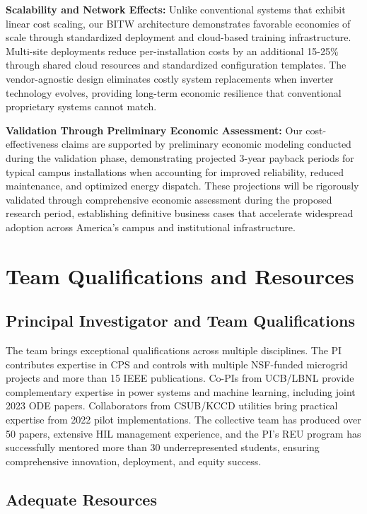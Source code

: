 \documentclass[12pt]{article}
\begin{document}
\textbf{Scalability and Network Effects:} Unlike conventional systems that exhibit linear cost scaling, our BITW architecture demonstrates favorable economies of scale through standardized deployment and cloud-based training infrastructure. Multi-site deployments reduce per-installation costs by an additional 15-25\% through shared cloud resources and standardized configuration templates. The vendor-agnostic design eliminates costly system replacements when inverter technology evolves, providing long-term economic resilience that conventional proprietary systems cannot match.

\textbf{Validation Through Preliminary Economic Assessment:} Our cost-effectiveness claims are supported by preliminary economic modeling conducted during the validation phase, demonstrating projected 3-year payback periods for typical campus installations when accounting for improved reliability, reduced maintenance, and optimized energy dispatch. These projections will be rigorously validated through comprehensive economic assessment during the proposed research period, establishing definitive business cases that accelerate widespread adoption across America's campus and institutional infrastructure.

\section{Team Qualifications and Resources}

\subsection{Principal Investigator and Team Qualifications}

The team brings exceptional qualifications across multiple disciplines. The PI contributes expertise in CPS and controls with multiple NSF-funded microgrid projects and more than 15 IEEE publications. Co-PIs from UCB/LBNL provide complementary expertise in power systems and machine learning, including joint 2023 ODE papers. Collaborators from CSUB/KCCD utilities bring practical expertise from 2022 pilot implementations. The collective team has produced over 50 papers, extensive HIL management experience, and the PI's REU program has successfully mentored more than 30 underrepresented students, ensuring comprehensive innovation, deployment, and equity success.

\subsection{Adequate Resources}
\end{document}

